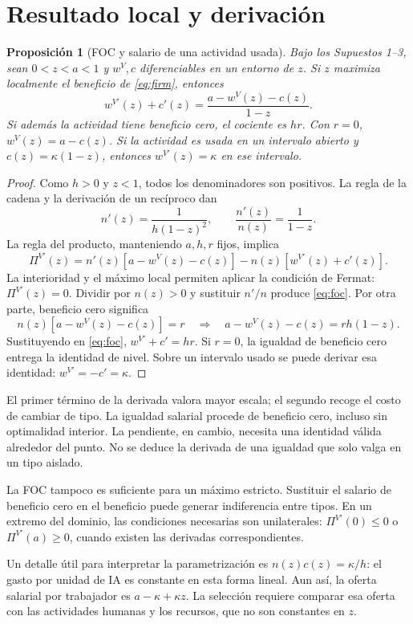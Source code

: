 \documentclass[11pt]{article}
\newtheorem{proposition}{Proposición}\newtheorem{assumption}{Supuesto}
\begin{document}
\section{Resultado local y derivación}
\begin{proposition}[FOC y salario de una actividad usada]\label{prop:local}
Bajo los Supuestos 1--3, sean $0<z<a<1$ y $w^V,c$ diferenciables en un entorno de $z$. Si $z$ maximiza localmente el beneficio de \eqref{eq:firm}, entonces
\begin{equation}\label{eq:foc}
w^{V\prime}(z)+c'(z)=\frac{a-w^V(z)-c(z)}{1-z}.
\end{equation}
Si además la actividad tiene beneficio cero, el cociente es $hr$. Con $r=0$, $w^V(z)=a-c(z)$. Si la actividad es usada en un intervalo abierto y $c(z)=\kappa(1-z)$, entonces $w^{V\prime}(z)=\kappa$ en ese intervalo.
\end{proposition}
\begin{proof}
Como $h>0$ y $z<1$, todos los denominadores son positivos. La regla de la cadena y la derivación de un recíproco dan
\[
n'(z)=\frac{1}{h(1-z)^2},\qquad
\frac{n'(z)}{n(z)}=\frac{1}{1-z}.
\]
La regla del producto, manteniendo $a,h,r$ fijos, implica
\[
\Pi^{V\prime}(z)=n'(z)[a-w^V(z)-c(z)]-n(z)[w^{V\prime}(z)+c'(z)].
\]
La interioridad y el máximo local permiten aplicar la condición de Fermat: $\Pi^{V\prime}(z)=0$. Dividir por $n(z)>0$ y sustituir $n'/n$ produce \eqref{eq:foc}. Por otra parte, beneficio cero significa
\[
 n(z)[a-w^V(z)-c(z)]=r
 \quad\Longrightarrow\quad a-w^V(z)-c(z)=rh(1-z).
\]
Sustituyendo en \eqref{eq:foc}, $w^{V\prime}+c'=hr$. Si $r=0$, la igualdad de beneficio cero entrega la identidad de nivel. Sobre un intervalo usado se puede derivar esa identidad: $w^{V\prime}=-c'=\kappa$.
\end{proof}
El primer término de la derivada valora mayor escala; el segundo recoge el costo de cambiar de tipo. La igualdad salarial procede de beneficio cero, incluso sin optimalidad interior. La pendiente, en cambio, necesita una identidad válida alrededor del punto. No se deduce la derivada de una igualdad que solo valga en un tipo aislado.

La FOC tampoco es suficiente para un máximo estricto. Sustituir el salario de beneficio cero en el beneficio puede generar indiferencia entre tipos. En un extremo del dominio, las condiciones necesarias son unilaterales: $\Pi^{V\prime}(0)\leq0$ o $\Pi^{V\prime}(a)\geq0$, cuando existen las derivadas correspondientes.

Un detalle útil para interpretar la parametrización es $n(z)c(z)=\kappa/h$: el gasto por unidad de IA es constante en esta forma lineal. Aun así, la oferta salarial por trabajador es $a-\kappa+\kappa z$. La selección requiere comparar esa oferta con las actividades humanas y los recursos, que no son constantes en $z$.
\newpage
\end{document}
